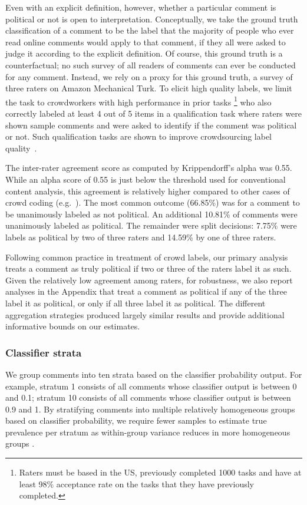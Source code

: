 \documentclass[letterpaper]{article} %
\begin{document}
Even with an explicit definition, however, whether a particular comment is political or not is open to interpretation. Conceptually, we take the ground truth classification of a comment to be the label that the majority of people who ever read online comments would apply to that comment, if they all were asked to judge it according to the explicit definition.
Of course, this ground truth is a counterfactual; no such survey of all readers of comments can ever be conducted for any comment. Instead, we rely on a proxy for this ground truth, a survey of three raters on Amazon Mechanical Turk. To elicit high quality labels, we limit the task to crowdworkers with high performance in prior tasks \footnote{Raters must be based in the US, previously completed 1000 tasks and have at least 98\% acceptance rate on the tasks that they have previously completed.} who also correctly labeled at least 4 out of 5 items in a qualification task where raters were shown sample comments and were asked to identify if the comment was political or not. Such qualification tasks are shown to improve crowdsourcing label quality~\cite{budak2016fair}.


The inter-rater agreement score as computed by Krippendorff's alpha was 0.55. While an alpha score of 0.55 is just below the threshold used for conventional content analysis, this agreement is relatively higher compared to other cases of crowd coding (e.g.~\cite{lind2017content}). The most common outcome (66.85\%) was for a comment to be unanimously labeled as not political. An additional 10.81\% of comments were unanimously labeled as political. The remainder were split decisions: 7.75\% were labels as political by two of three raters and 14.59\% by one of three raters.

Following common practice in treatment of crowd labels, our primary analysis treats a comment as truly political if two or three of the raters label it as such. Given the relatively low agreement among raters, for robustness, we also report analyses in the Appendix that treat a comment as political if any of the three label it as political, or only if all three label it as political. The different aggregation strategies produced largely similar results and provide additional informative bounds on our estimates.

\subsubsection{Classifier strata}

We group comments into ten strata based on the classifier probability output. For example, stratum 1 consists of all comments whose classifier output is between 0 and 0.1; stratum 10 consists of all comments whose classifier output is between 0.9 and 1. By stratifying comments into multiple relatively homogeneous groups based on classifier probability, we require fewer samples to estimate true prevalence per stratum as within-group variance reduces in more homogeneous groups \cite{Cochran_1977}.
\end{document}
